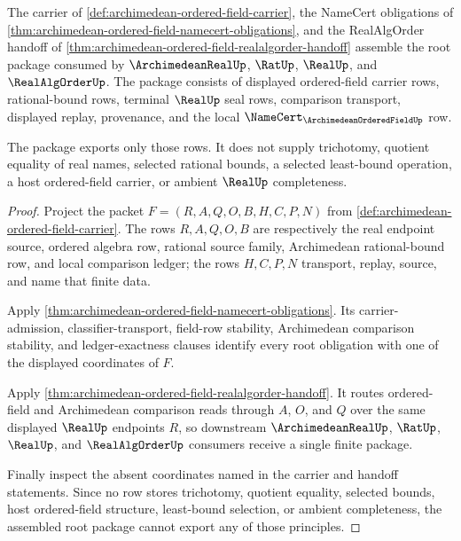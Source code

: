 \begin{theorem}
\label{thm:archimedean-ordered-field-root-obligation-package}
The carrier of \autoref{def:archimedean-ordered-field-carrier}, the NameCert obligations of \autoref{thm:archimedean-ordered-field-namecert-obligations}, and the RealAlgOrder handoff of \autoref{thm:archimedean-ordered-field-realalgorder-handoff} assemble the root package consumed by $\ArchimedeanRealUp$, $\RatUp$, $\RealUp$, and $\RealAlgOrderUp$. The package consists of displayed ordered-field carrier rows, rational-bound rows, terminal $\RealUp$ seal rows, comparison transport, displayed replay, provenance, and the local $\NameCert_{\ArchimedeanOrderedFieldUp}$ row.

The package exports only those rows. It does not supply trichotomy, quotient equality of real names, selected rational bounds, a selected least-bound operation, a host ordered-field carrier, or ambient $\RealUp$ completeness.
\end{theorem}
\begin{proof}
Project the packet $F=(R,A,Q,O,B,H,C,P,N)$ from \autoref{def:archimedean-ordered-field-carrier}. The rows $R,A,Q,O,B$ are respectively the real endpoint source, ordered algebra row, rational source family, Archimedean rational-bound row, and local comparison ledger; the rows $H,C,P,N$ transport, replay, source, and name that finite data.

Apply \autoref{thm:archimedean-ordered-field-namecert-obligations}. Its carrier-admission, classifier-transport, field-row stability, Archimedean comparison stability, and ledger-exactness clauses identify every root obligation with one of the displayed coordinates of $F$.

Apply \autoref{thm:archimedean-ordered-field-realalgorder-handoff}. It routes ordered-field and Archimedean comparison reads through $A$, $O$, and $Q$ over the same displayed $\RealUp$ endpoints $R$, so downstream $\ArchimedeanRealUp$, $\RatUp$, $\RealUp$, and $\RealAlgOrderUp$ consumers receive a single finite package.

Finally inspect the absent coordinates named in the carrier and handoff statements. Since no row stores trichotomy, quotient equality, selected bounds, host ordered-field structure, least-bound selection, or ambient completeness, the assembled root package cannot export any of those principles.
\end{proof}

